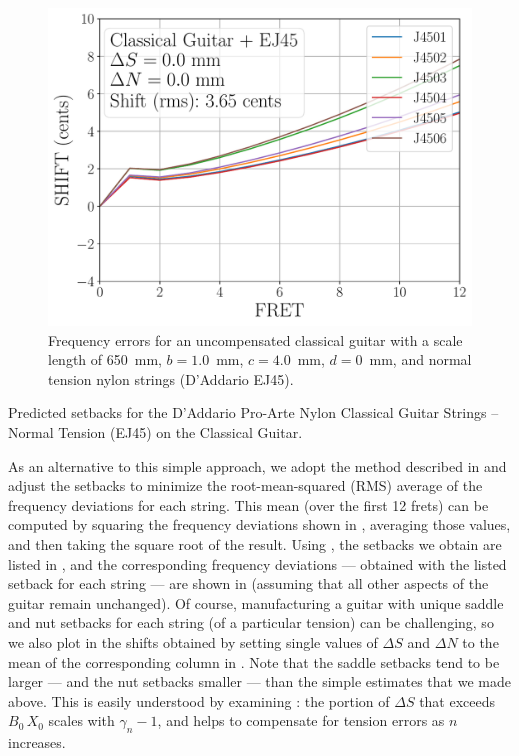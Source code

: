 \begin{figure}
  \centering
  \includegraphics[width=5.0in]{../figures/shift_classicalguitar_ej45_null}
  \caption{\label{fig:shift_classicalguitar_ej45_null} Frequency errors for an uncompensated classical guitar with a scale length of 650~mm, $b = 1.0$~mm, $c = 4.0$~mm, $d = 0$~mm, and normal tension nylon strings (D'Addario EJ45).}
\end{figure}

\begin{table}%
  \centering
  \caption{\label{tbl:ej45_setbacks} Predicted setbacks for the D'Addario Pro-Arte Nylon Classical Guitar Strings -- Normal Tension (EJ45) on the Classical Guitar.}
  
\end{table}%

As an alternative to this simple approach, we adopt the method described in  and adjust the setbacks to minimize the root-mean-squared (RMS) average of the frequency deviations for each string. This mean (over the first 12 frets) can be computed by squaring the frequency deviations shown in , averaging those values, and then taking the square root of the result. Using , the setbacks we obtain are listed in , and the corresponding frequency deviations --- obtained with the listed setback for each string --- are shown in  (assuming that all other aspects of the guitar remain unchanged). Of course, manufacturing a guitar with unique saddle and nut setbacks for each string (of a particular tension) can be challenging, so we also plot in  the shifts obtained by setting single values of $\Delta S$ and $\Delta N$ to the mean of the corresponding column in  . Note that the saddle setbacks tend to be larger --- and the nut setbacks smaller --- than the simple estimates that we made above. This is easily understood by examining : the portion of $\Delta S$ that exceeds $B_0\, X_0$ scales with $\gamma_n - 1$, and helps to compensate for tension errors as $n$ increases.

